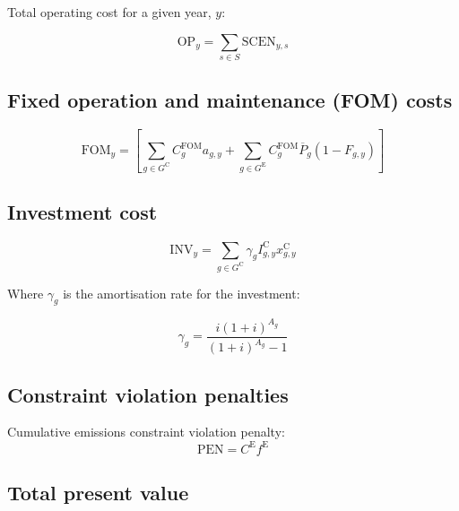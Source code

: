 \documentclass{article}
\newcommand{\sGeneratorsExisting}{G^{\mathrm{E}}}
\newcommand{\sGeneratorsCandidate}{G^{\mathrm{C}}}
\newcommand{\sScenarios}{S}
\newcommand{\sScenariosYear}{\sScenarios_{\iYear}}
\newcommand{\iGenerator}{g}
\newcommand{\iYear}{y}
\newcommand{\iScenario}{s}
\newcommand{\cOperatingCost}[1][\iYear,\iScenario]{\mathrm{OP}_{#1}}
\newcommand{\cFixedOperationsMaintenanceCost}[1][\iGenerator]{\mathrm{FOM}_{#1}}
\newcommand{\cFixedOperationsMaintenanceCostGenerator}[1][\iGenerator]{C^{\mathrm{FOM}}_{#1}}
\newcommand{\cPowerOutputMax}[1][\iGenerator,\iYear]{\overline{P}_{#1}}
\newcommand{\cAmortisationRate}[1][\iGenerator]{\gamma_{#1}}
\newcommand{\cCandidateInvestmentCost}[1][\iGenerator,\iYear]{I^{\mathrm{C}}_{#1}}
\newcommand{\cInvestmentCost}[1][\iYear]{\mathrm{INV}_{#1}}
\newcommand{\cInterestRate}{i}
\newcommand{\cAssetLifetime}[1][\iGenerator]{A_{#1}}
\newcommand{\cEmissionsTargetViolationPenalty}{C^{\mathrm{E}}}
\newcommand{\cEmissionsViolationTotalCost}{\mathrm{PEN}}
\newcommand{\cOperatingCostScenario}[1][\iYear,\iScenario]{\mathrm{SCEN}_{#1}}
\newcommand{\cRetirementIndicator}[1][\iGenerator,\iYear]{F_{#1}}
\newcommand{\vInstalledCapacity}[1][\iGenerator,\iYear]{x^{\mathrm{C}}_{#1}}
\newcommand{\vEmissionsTargetViolation}{f^{\mathrm{E}}}
\newcommand{\vInstalledCapacityTotal}[1][\iGenerator,\iYear]{a_{#1}}
\begin{document}
Total operating cost for a given year, $\iYear$:

\begin{equation}
	\cOperatingCost[\iYear] = \sum\limits_{\iScenario \in \sScenarios} \cOperatingCostScenario
\end{equation}

\subsection{Fixed operation and maintenance (FOM) costs}

\begin{equation}
	\cFixedOperationsMaintenanceCost[\iYear] = \left[\sum\limits_{\iGenerator \in \sGeneratorsCandidate} \cFixedOperationsMaintenanceCostGenerator \vInstalledCapacityTotal + \sum\limits_{\iGenerator \in \sGeneratorsExisting} \cFixedOperationsMaintenanceCostGenerator \cPowerOutputMax[\iGenerator] \left(1 - \cRetirementIndicator\right) \right]
\end{equation}

\subsection{Investment cost}

\begin{equation}
	\cInvestmentCost = \sum\limits_{g\in \sGeneratorsCandidate} \cAmortisationRate  \cCandidateInvestmentCost \vInstalledCapacity
\end{equation}

Where $\cAmortisationRate$ is the amortisation rate for the investment:

\begin{equation}
	\cAmortisationRate = \frac{\cInterestRate(1+\cInterestRate)^{\cAssetLifetime}}{(1+\cInterestRate)^{\cAssetLifetime} - 1}
\end{equation}

\subsection{Constraint violation penalties}
Cumulative emissions constraint violation penalty:
\begin{equation}
	\cEmissionsViolationTotalCost = \cEmissionsTargetViolationPenalty \vEmissionsTargetViolation
\end{equation}

\subsection{Total present value}
\end{document}

